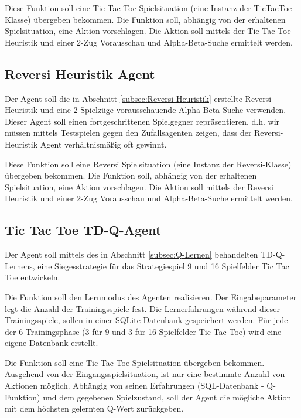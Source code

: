 Diese Funktion soll eine Tic Tac Toe Spielsituation (eine Instanz der TicTacToe-Klasse) übergeben bekommen. Die Funktion soll, abhängig von der erhaltenen Spielsituation, eine Aktion vorschlagen. Die Aktion soll mittels der Tic Tac Toe Heuristik und einer 2-Zug Vorausschau und Alpha-Beta-Suche ermittelt werden.
\newpage

\subsection{Reversi Heuristik Agent}
Der Agent soll die in Abschnitt \ref{subsec:Reversi Heuristik} erstellte Reversi Heuristik und eine 2-Spielzüge vorausschauende Alpha-Beta Suche verwenden. Dieser Agent soll einen fortgeschrittenen Spielgegner repräsentieren, d.h. wir müssen mittels Testspielen gegen den Zufallsagenten zeigen, dass der Reversi-Heuristik Agent verhältnismäßig oft gewinnt.

Diese Funktion soll eine Reversi Spielsituation (eine Instanz der Reversi-Klasse) übergeben bekommen. Die Funktion soll, abhängig von der erhaltenen Spielsituation, eine Aktion vorschlagen. Die Aktion soll mittels der Reversi Heuristik und einer 2-Zug Vorausschau und Alpha-Beta-Suche ermittelt werden.

\subsection{Tic Tac Toe TD-Q-Agent}
Der Agent soll mittels des in Abschnitt \ref{subsec:Q-Lernen} behandelten TD-Q-Lernens, eine Siegesstrategie für das Strategiespiel 9 und 16 Spielfelder Tic Tac Toe entwickeln. 

Die Funktion soll den Lernmodus des Agenten realisieren. Der Eingabeparameter legt die Anzahl der Trainingsspiele fest. Die Lernerfahrungen während dieser Trainingsspiele, sollen in einer SQLite Datenbank gespeichert werden. Für jede der 6 Trainingsphase (3 für 9 und 3 für 16 Spielfelder Tic Tac Toe) wird eine eigene Datenbank erstellt.

Die Funktion soll eine Tic Tac Toe Spielsituation übergeben bekommen. Ausgehend von der Eingangsspielsituation, ist nur eine bestimmte Anzahl von Aktionen möglich. Abhängig von seinen Erfahrungen (SQL-Datenbank - Q-Funktion) und dem gegebenen Spielzustand, soll der Agent die mögliche Aktion mit dem höchsten gelernten Q-Wert zurückgeben.
\newpage

